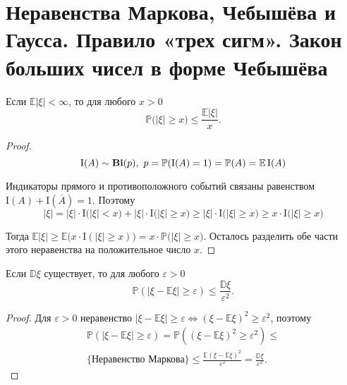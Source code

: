 \section{Неравенства Маркова, Чебышёва и Гаусса. Правило «трех сигм». Закон больших чисел в форме Чебышёва}
\begin{namedthm}
    Если $\mathbb{E}|\xi| < \infty$, то для любого $x > 0$
    \begin{equation*}
        \mathbb{P}\bigl( |\xi| \geqslant x \bigr) \leqslant \frac{\mathbb{E}|\xi|}{x}.
    \end{equation*}
\end{namedthm}

\begin{proof}
    \begin{equation*}
        \mathrm{I}(A) \sim \mathbf{Bi}(p),~ p = {\mathbb{P}(\mathrm{I}(A) = 1)} = {\mathbb{P}(A)} = \mathbb{E}\,\mathrm{I}(A)
    \end{equation*}
    
    Индикаторы прямого и противоположного событий связаны равенством $\mathrm{I}(A) + \mathrm{I}(\overline{A}) = 1.$ 
    Поэтому
    \begin{equation*}
        |\xi|=|\xi| \cdot \mathrm{I}\bigl(|\xi|<x\bigr) + |\xi| \cdot \mathrm{I}\bigl(|\xi| \geqslant x \bigr) \geqslant
        |\xi| \cdot \mathrm{I} \bigl( |\xi| \geqslant x \bigr) \geqslant 
        x \cdot \mathrm{I} \bigl(|\xi| \geqslant x \bigr)
    \end{equation*}
    
    Тогда $\mathbb{E}|\xi| \geqslant \mathbb{E} \bigl(x \cdot \mathrm{I}(|\xi| \geqslant x) \bigr) = x \cdot \mathbb{P} \bigl( |\xi| \geqslant x \bigr)$. 
    Осталось разделить обе части этого неравенства на положительное число $x$.
\end{proof}

\begin{namedthm}
    Если $\mathbb{D}\xi$ существует, то для любого $\varepsilon > 0$
    \begin{equation*}
        \mathbb{P}(|\xi-\mathbb{E} \xi| \geqslant \varepsilon) \leqslant \frac{\mathbb{D} \xi}{\varepsilon^{2}}.
    \end{equation*}
\end{namedthm}

\begin{proof}
    Для $\varepsilon > 0$ неравенство $|\xi - \mathbb{E}\xi| \geqslant \varepsilon \Leftrightarrow (\xi - \mathbb{E}\xi)^2 \geqslant \varepsilon^2$, поэтому
    \begin{multline*}
        \mathbb{P}(|\xi-\mathbb{E} \xi| \geqslant \varepsilon) = 
        \mathbb{P}\left((\xi-\mathbb{E} \xi)^{2} \geqslant \varepsilon^{2}\right) \leqslant \\ 
        \text{\{Неравенство Маркова\}} \leqslant 
        \frac{\mathbb{E}(\xi-\mathbb{E} \xi)^{2}}{\varepsilon^{2}} =
        \frac{\mathbb{D} \xi}{\varepsilon^{2}}.
    \end{multline*}
\end{proof}

